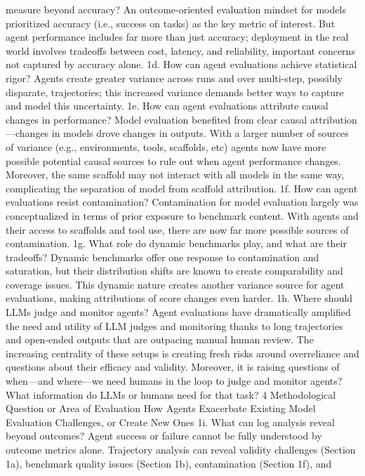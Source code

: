 measure beyond accuracy?
An outcome-oriented evaluation mindset for models prioritized accuracy
(i.e., success on tasks) as the key metric of interest. But agent
performance includes far more than just accuracy; deployment in the real
world involves tradeoffs between cost, latency, and reliability, important
concerns not captured by accuracy alone.
1d. How can agent evaluations
achieve statistical rigor?
Agents create greater variance across runs and over multi-step, possibly
disparate, trajectories; this increased variance demands better ways to
capture and model this uncertainty.
1e. How can agent evaluations
attribute causal changes in
performance?
Model evaluation benefited from clear causal attribution—changes in
models drove changes in outputs. With a larger number of sources of
variance (e.g., environments, tools, scaffolds, etc) agents now have more
possible potential causal sources to rule out when agent performance
changes. Moreover, the same scaffold may not interact with all models in
the same way, complicating the separation of model from scaffold
attribution.
1f. How can agent evaluations resist
contamination?
Contamination for model evaluation largely was conceptualized in terms
of prior exposure to benchmark content. With agents and their access to
scaffolds and tool use, there are now far more possible sources of
contamination.
1g. What role do dynamic benchmarks
play, and what are their tradeoffs?
Dynamic benchmarks offer one response to contamination and saturation,
but their distribution shifts are known to create comparability and
coverage issues. This dynamic nature creates another variance source for
agent evaluations, making attributions of score changes even harder.
1h. Where should LLMs judge and
monitor agents?
Agent evaluations have dramatically amplified the need and utility of
LLM judges and monitoring thanks to long trajectories and open-ended
outputs that are outpacing manual human review. The increasing
centrality of these setups is creating fresh risks around overreliance and
questions about their efficacy and validity. Moreover, it is raising questions
of when—and where—we need humans in the loop to judge and monitor
agents? What information do LLMs or humans need for that task?
4
Methodological Question or Area of
Evaluation
How Agents Exacerbate Existing Model Evaluation Challenges, or
Create New Ones
1i. What can log analysis reveal
beyond outcomes?
Agent success or failure cannot be fully understood by outcome metrics
alone. Trajectory analysis can reveal validity challenges (Section 1a),
benchmark quality issues (Section 1b), contamination (Section 1f), and
